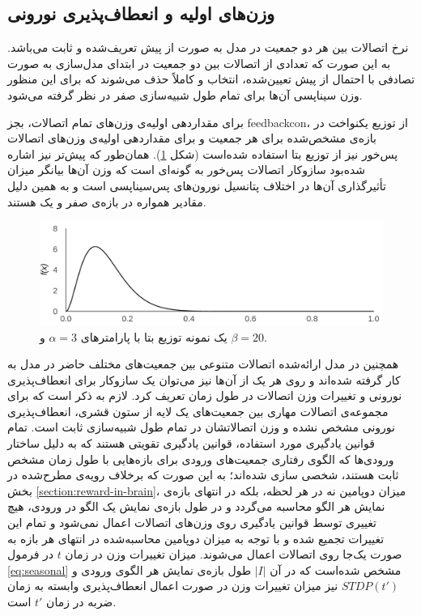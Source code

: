 \documentclass[12pt]{report}
\begin{document}
	\subsection{وزن‌های اولیه و انعطاف‌پذیری نورونی}
	نرخ اتصالات بین هر دو جمعیت در مدل به صورت از پیش تعریف‌شده و ثابت می‌باشد. به این صورت که تعدادی از اتصالات بین دو جمعیت در ابتدای مدل‌سازی به صورت تصادفی با احتمال از پیش تعیین‌شده، انتخاب و کاملاً حذف می‌شوند که برای این منظور وزن سیناپسی‌ آن‌ها برای تمام طول شبیه‌سازی صفر در نظر گرفته می‌شود.
	
	برای مقداردهی اولیه‌ی وزن‌های تمام اتصالات، بجز \gls{feedbackcon}، از توزیع یکنواخت در بازه‌ی مشخص‌شده برای هر جمعیت و برای مقداردهی اولیه‌ی وزن‌های اتصالات پس‌خور نیز از توزیع بتا استفاده شده‌است (شکل \ref{fig:beta}). همان‌طور که پیش‌تر نیز اشاره شده‌بود سازوکار اتصالات پس‌خور به گونه‌ای است که وزن آن‌ها بیانگر میزان تأثیرگذاری آن‌ها در اختلاف پتانسیل نورون‌های پس‌سیناپسی است و به همین دلیل مقادیر همواره در بازه‌ی صفر و یک هستند.
	
	\begin{figure}[]
		\centering
		\includegraphics[width=0.8\linewidth]{beta-3-20.png}
		\caption[NS]{
			یک نمونه توزیع بتا با پارامتر‌های $\alpha=3$ و $\beta=20$.
		}
		\label{fig:beta} 
	\end{figure}
	
	همچنین در مدل ارائه‌شده اتصالات متنوعی بین جمعیت‌های مختلف حاضر در مدل به کار گرفته شده‌اند و روی هر یک از آن‌ها نیز می‌توان یک سازوکار برای انعطاف‌پذیری نورونی و تغییرات وزن اتصالات در طول زمان تعریف کرد. لازم به ذکر است که برای مجموعه‌ی اتصالات مهاری بین جمعیت‌های یک لایه از ستون قشری، انعطاف‌پذیری نورونی مشخص نشده و وزن اتصالاتشان در تمام طول شبیه‌سازی ثابت است. تمام قوانین یادگیری مورد استفاده، قوانین یادگیری تقویتی هستند که به دلیل ساختار ورودی‌ها که الگوی رفتاری جمعیت‌های ورودی برای بازه‌هایی با طول زمان مشخص ثابت هستند، شخصی سازی شده‌اند؛ به این صورت که برخلاف رویه‌ی مطرح‌شده در بخش \ref{section:reward-in-brain}، میزان دوپامین نه در هر لحظه، بلکه در انتهای بازه‌ی نمایش هر الگو محاسبه می‌گردد و در طول بازه‌ی نمایش یک الگو در ورودی، هیچ تغییری توسط قوانین یادگیری روی وزن‌های اتصالات اعمال نمی‌شود و تمام این تغییرات تجمیع شده و  با توجه به میزان دوپامین محاسبه‌شده در انتهای هر بازه به صورت یک‌جا روی اتصالات اعمال می‌شوند. میزان تغییرات وزن در زمان $t$ در فرمول \ref{eq:seasonal} مشخص شده‌است که در آن $|I|$ طول بازه‌ی نمایش هر الگوی ورودی و $STDP(t')$ نیز میزان تغییرات وزن در صورت اعمال انعطاف‌پذیری وابسته به زمان ضربه در زمان $t'$ است.
	
\end{document}
